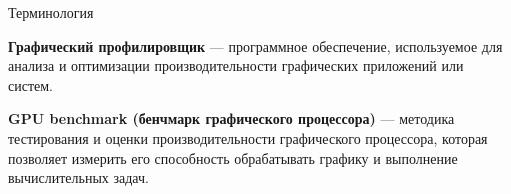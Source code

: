 \documentclass{beamer}
\begin{document}
\begin{frame}{Терминология}
{	\textbf{Графический профилировщик} --- программное обеспечение, используемое для анализа и оптимизации производительности графических приложений или систем. 
	
	\textbf{GPU benchmark (бенчмарк графического процессора)} --- методика тестирования и оценки производительности графического процессора, которая позволяет измерить его способность обрабатывать графику и выполнение вычислительных задач. 
}
\end{frame}
\end{document}
